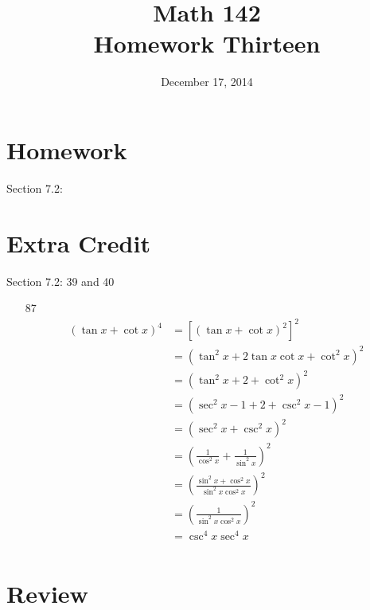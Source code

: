 \documentclass{exam}
\author{}
\date{December 17, 2014}
\title{Math 142 \\ Homework Thirteen}
\begin{document}
  \maketitle

  \section{Homework}
  Section 7.2: 

  \section{Extra Credit}
  Section 7.2: 39 and 40

  \ifprintanswers
    \pagebreak
    \begin{enumerate}

      \item[87] 
        \begin{align*}
          (\tan x + \cot x)^4 & = \left[ (\tan x + \cot x)^2 \right]^2 \\
                              & = \left( \tan^2 x + 2 \tan x \cot x + \cot^2 x \right)^2 \\
                              & = \left( \tan^2 x + 2 + \cot^2 x \right)^2 \\
                              & = \left( \sec^2 x - 1 + 2 + \csc^2 x - 1 \right)^2 \\
                              & = \left( \sec^2 x + \csc^2 x \right)^2 \\
                              & = \left( \frac{1}{\cos^2 x} + \frac{1}{\sin^2 x} \right)^2 \\
                              & = \left( \frac{\sin^2 x + \cos^2 x}{\sin^2 x \cos^2 x} \right)^2 \\
                              & = \left( \frac{1}{\sin^2 x \cos^2 x} \right)^2 \\
                              & = \csc^4 x \sec^4 x \\
        \end{align*}

    \end{enumerate}
  \fi

  \section{Review}

  \ifprintanswers
\end{document}
